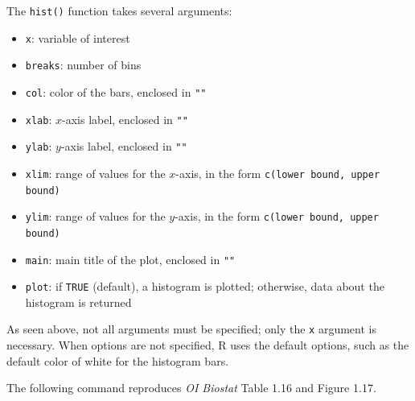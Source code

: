 \documentclass{article}\usepackage[]{graphicx}\usepackage[]{color}
\begin{document}
The \texttt{hist()} function takes several arguments:
\begin{itemize}
\item \texttt{x}: variable of interest
\item \texttt{breaks}: number of bins
\item \texttt{col}: color of the bars, enclosed in \texttt{""}
\item \texttt{xlab}: $x$-axis label, enclosed in \texttt{""}
\item \texttt{ylab}: $y$-axis label, enclosed in \texttt{""}
\item \texttt{xlim}: range of values for the $x$-axis, in the form \texttt{c(lower bound, upper bound)}
\item \texttt{ylim}: range of values for the $y$-axis, in the form \texttt{c(lower bound, upper bound)}
\item \texttt{main}: main title of the plot, enclosed in \texttt{""} 
\item \texttt{plot}: if \texttt{TRUE} (default), a histogram is plotted; otherwise, data about the histogram is returned
\end{itemize}

As seen above, not all arguments must be specified; only the \texttt{x} argument is necessary. When options are not specified, \textsf{R} uses the default options, such as the default color of white for the histogram bars.

The following command reproduces \textit{OI Biostat} Table 1.16 and Figure 1.17.
\end{document}
